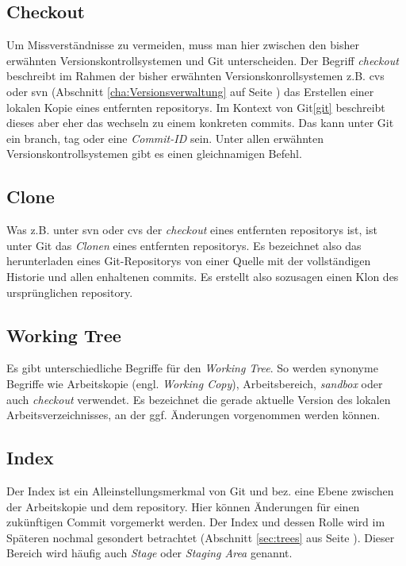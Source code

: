 \subsection{Checkout}\label{sec:checkout} Um Missverständnisse zu vermeiden,
muss man hier zwischen den bisher erwähnten Versionskontrollsystemen und Git
unterscheiden. Der Begriff \textit{checkout} beschreibt im Rahmen der bisher
erwähnten Versionskonrollsystemen z.B. \acrshort{cvs} oder \acrshort{svn}
(Abschnitt \ref{cha:Versionsverwaltung} auf Seite
\pageref{cha:Versionsverwaltung}) das Erstellen einer lokalen Kopie eines
entfernten \glspl{repository}. Im Kontext von Git\ref{git} beschreibt dieses
aber eher das wechseln zu einem konkreten \glspl{commit}. Das kann unter Git
ein \gls{branch}, \gls{tag} oder eine \textit{Commit-ID} sein. Unter allen
erwähnten Versionskontrollsystemen gibt es einen gleichnamigen Befehl.

\subsection{Clone}\label{sec:clone}
Was z.B. unter \acrshort{svn} oder \acrshort{cvs} der \textit{checkout} eines
entfernten \glspl{repository} ist, ist unter Git das \textit{Clonen} eines
entfernten \glspl{repository}. Es bezeichnet also das herunterladen eines
Git-Repositorys von einer Quelle mit der vollständigen Historie und allen
enhaltenen \glspl{commit}. Es erstellt also sozusagen einen Klon des
ursprünglichen \gls{repository}.\cite[S.~21]{gitosp}

\subsection{Working Tree}\label{sec:workingtree} Es gibt unterschiedliche
Begriffe für den \textit{Working Tree}. So werden synonyme Begriffe wie
Arbeitskopie (engl. \textit{Working Copy}), Arbeitsbereich, \textit{sandbox}
oder auch \textit{checkout} verwendet. Es bezeichnet die gerade aktuelle
Version des lokalen Arbeitsverzeichnisses, an der ggf.  Änderungen vorgenommen
werden können.\cite[S.~20]{gitosp}

\subsection{Index}\label{sec:index}
Der Index ist ein Alleinstellungsmerkmal von Git und bez. eine Ebene zwischen
der Arbeitskopie und dem \gls{repository}. Hier können Änderungen für einen
zukünftigen Commit vorgemerkt werden\cite[S.~20]{gitosp}. Der Index und dessen
Rolle wird im Späteren nochmal gesondert betrachtet (Abschnitt \ref{sec:trees}
aus Seite \pageref{sec:trees}). Dieser Bereich wird häufig auch \textit{Stage}
oder \textit{Staging Area} genannt\cite[S.~11]{progit}.

